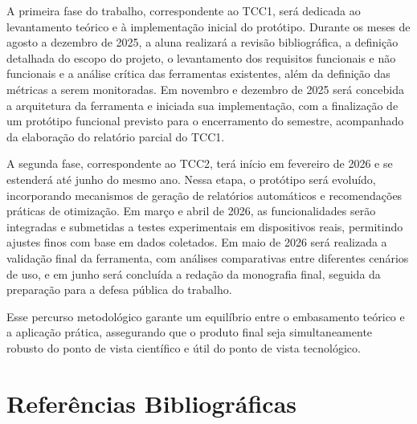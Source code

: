 \documentclass[12pt,a4paper]{article}
\begin{document}
A primeira fase do trabalho, correspondente ao TCC1, será dedicada ao levantamento teórico e à implementação inicial do protótipo. Durante os meses de agosto a dezembro de 2025, a aluna realizará a revisão bibliográfica, a definição detalhada do escopo do projeto, o levantamento dos requisitos funcionais e não funcionais e a análise crítica das ferramentas existentes, além da definição das métricas a serem monitoradas. Em novembro e dezembro de 2025 será concebida a arquitetura da ferramenta e iniciada sua implementação, com a finalização de um protótipo funcional previsto para o encerramento do semestre, acompanhado da elaboração do relatório parcial do TCC1.  

A segunda fase, correspondente ao TCC2, terá início em fevereiro de 2026 e se estenderá até junho do mesmo ano. Nessa etapa, o protótipo será evoluído, incorporando mecanismos de geração de relatórios automáticos e recomendações práticas de otimização. Em março e abril de 2026, as funcionalidades serão integradas e submetidas a testes experimentais em dispositivos reais, permitindo ajustes finos com base em dados coletados. Em maio de 2026 será realizada a validação final da ferramenta, com análises comparativas entre diferentes cenários de uso, e em junho será concluída a redação da monografia final, seguida da preparação para a defesa pública do trabalho.  

Esse percurso metodológico garante um equilíbrio entre o embasamento teórico e a aplicação prática, assegurando que o produto final seja simultaneamente robusto do ponto de vista científico e útil do ponto de vista tecnológico.

\section{Referências Bibliográficas}
\end{document}
